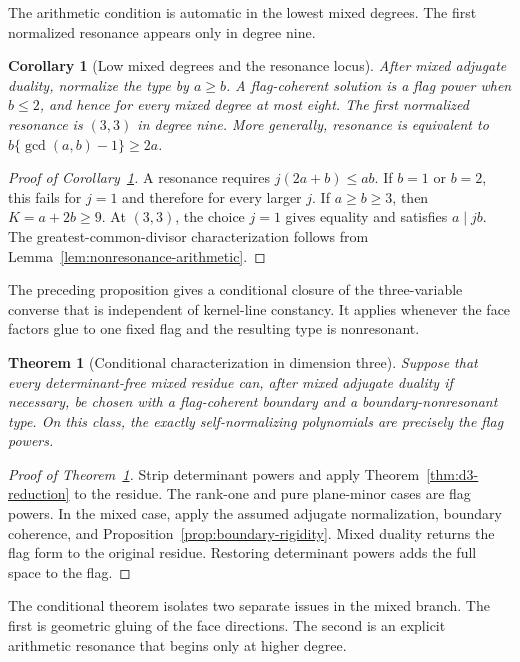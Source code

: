 \documentclass[12pt,a4paper]{article}
\theoremstyle{plain}
\newtheorem{theorem}{Theorem}
\newtheorem{corollary}{Corollary}
\theoremstyle{definition}
\begin{document}
The arithmetic condition is automatic in the lowest mixed degrees.
The first normalized resonance appears only in degree nine.

\begin{corollary}[Low mixed degrees and the resonance locus]
\label{cor:low-mixed}
    After mixed adjugate duality, normalize the type by $a\ge b$.
    A flag-coherent solution is a flag power when $b\le2$, and hence for every mixed degree at most eight.
    The first normalized resonance is $(3,3)$ in degree nine.
    More generally, resonance is equivalent to $b\{\gcd(a,b)-1\}\ge2a$.
\end{corollary}

\begin{proof}[Proof of Corollary~\ref{cor:low-mixed}]
    A resonance requires $j(2a+b)\le ab$.
    If $b=1$ or $b=2$, this fails for $j=1$ and therefore for every larger $j$.
    If $a\ge b\ge3$, then $K=a+2b\ge9$.
    At $(3,3)$, the choice $j=1$ gives equality and satisfies $a\mid jb$.
    The greatest-common-divisor characterization follows from Lemma~\ref{lem:nonresonance-arithmetic}.
\end{proof}

The preceding proposition gives a conditional closure of the three-variable converse that is independent of kernel-line constancy.
It applies whenever the face factors glue to one fixed flag and the resulting type is nonresonant.

\begin{theorem}[Conditional characterization in dimension three]
\label{thm:conditional-d3}
    Suppose that every determinant-free mixed residue can, after mixed adjugate duality if necessary, be chosen with a flag-coherent boundary and a boundary-nonresonant type.
    On this class, the exactly self-normalizing polynomials are precisely the flag powers.
\end{theorem}

\begin{proof}[Proof of Theorem~\ref{thm:conditional-d3}]
    Strip determinant powers and apply Theorem~\ref{thm:d3-reduction} to the residue.
    The rank-one and pure plane-minor cases are flag powers.
    In the mixed case, apply the assumed adjugate normalization, boundary coherence, and Proposition~\ref{prop:boundary-rigidity}.
    Mixed duality returns the flag form to the original residue.
    Restoring determinant powers adds the full space to the flag.
\end{proof}

The conditional theorem isolates two separate issues in the mixed branch.
The first is geometric gluing of the face directions.
The second is an explicit arithmetic resonance that begins only at higher degree.
\end{document}

